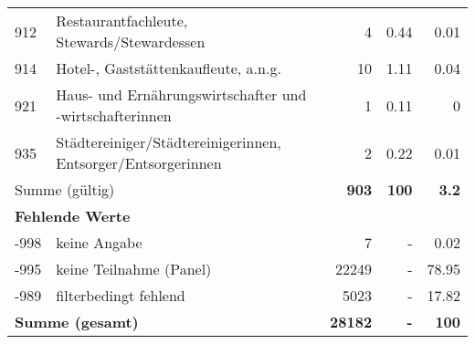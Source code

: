 \begin{longtable}{lXrrr}
        912 & \multicolumn{1}{X}{Restaurantfachleute, Stewards/Stewardessen} & %
          \num{4} &
          \num[round-mode=places,round-precision=2]{0.44} &
          \num[round-mode=places,round-precision=2]{0.01} \\

        914 & \multicolumn{1}{X}{Hotel-, Gaststättenkaufleute, a.n.g.} & %
          \num{10} &
          \num[round-mode=places,round-precision=2]{1.11} &
          \num[round-mode=places,round-precision=2]{0.04} \\

        921 & \multicolumn{1}{X}{Haus- und Ernährungswirtschafter und -wirtschafterinnen} & %
          \num{1} &
          \num[round-mode=places,round-precision=2]{0.11} &
          \num[round-mode=places,round-precision=2]{0} \\

        935 & \multicolumn{1}{X}{Städtereiniger/Städtereinigerinnen, Entsorger/Entsorgerinnen} & %
          \num{2} &
          \num[round-mode=places,round-precision=2]{0.22} &
          \num[round-mode=places,round-precision=2]{0.01} \\

     \midrule
     \multicolumn{2}{l}{Summe (gültig)} &
       \textbf{\num{903}} &
     \textbf{\num{100}} &
       \textbf{\num[round-mode=places,round-precision=2]{3.2}} \\
     \multicolumn{5}{l}{\textbf{Fehlende Werte}}\\
       -998 &
       keine Angabe &
         \num{7} &
        - &
         \num[round-mode=places,round-precision=2]{0.02} \\
       -995 &
       keine Teilnahme (Panel) &
         \num{22249} &
        - &
         \num[round-mode=places,round-precision=2]{78.95} \\
       -989 &
       filterbedingt fehlend &
         \num{5023} &
        - &
         \num[round-mode=places,round-precision=2]{17.82} \\
     \midrule
     \multicolumn{2}{l}{\textbf{Summe (gesamt)}} &
          \textbf{\num{28182}} &
        \textbf{-} &
        \textbf{\num{100}} \\
     \bottomrule
     \end{longtable}
     
